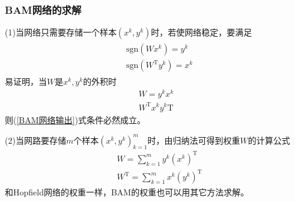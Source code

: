 {        \subsubsection{BAM网络的求解}
            \par
            (1)当网络只需要存储一个样本$(x^k,y^k)$时，若使网络稳定，要满足
            \begin{align}
            \label{BAM网络输出}
            \begin{aligned}
            & \mathrm{sgn}(Wx^k) = y^k\\
            & \mathrm{sgn}(W^\mathrm{T}y^k) = x^k
            \end{aligned}
            \end{align}
            易证明，当$W$是$x^k,y^k$的外积时
            \begin{align*}
            W = y^k x^k\\
            W^\mathrm{T}x^ky^k\mathrm{T}
            \end{align*}
            则(\ref{BAM网络输出})式条件必然成立。
            \par
            (2)当网路要存储$m$个样本$(x^k,y^k)_{k=1}^m$时，由归纳法可得到权重$W$的计算公式
            \begin{align*}
            & W = \sum_{k=1}^my^k(x^k)^\mathrm{T}\\
            & W^\mathrm{T}= \sum_{k=1}^mx^k(y^k)^\mathrm{T}
            \end{align*}
            和Hopfield网络的权重一样，BAM的权重也可以用其它方法求解。
}
